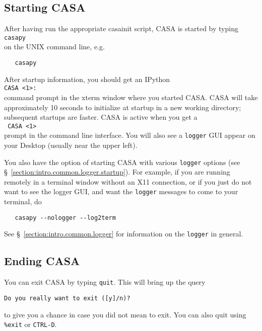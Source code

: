 \subsection{Starting CASA}
\label{section:intro.basics.starting}

After having run the appropriate casainit script, CASA is started by
typing\\ {\tt casapy}\\ on the UNIX command line, e.g.
\small
\begin{verbatim}
   casapy
\end{verbatim}
\normalsize
After startup information,
you should get an IPython\\ {\tt CASA <1>:}\\ command prompt in the
xterm window where you started CASA. CASA will take approximately 10
seconds to initialize at startup in a new working directory;
subsequent startups are faster.  CASA is active when you get a\\ {\tt
CASA <1>}\\ prompt in the command line interface.  You will also
see a {\tt logger} GUI appear on your Desktop (usually near the
upper left).  

You also have the option of starting CASA with various {\tt logger}
options (see \S~\ref{section:intro.common.logger.startup}).  For
example, if you are running remotely in a terminal window without
an X11 connection, or if you just do not want to see the logger GUI,
and want the {\tt logger} messages to come to your terminal, do
\small
\begin{verbatim}
   casapy --nologger --log2term
\end{verbatim}
\normalsize

See \S~\ref{section:intro.common.logger} for information on the
{\tt logger} in general.

\subsection{Ending CASA}
\label{section:intro.basics.ending}

You can exit CASA by typing {\tt quit}.  This will bring up the
query
\small
\begin{verbatim}
Do you really want to exit ([y]/n)?
\end{verbatim}
\normalsize
to give you a chance in case you did not mean to exit.  You can
also quit using {\tt \%exit} or {\tt CTRL-D}.

